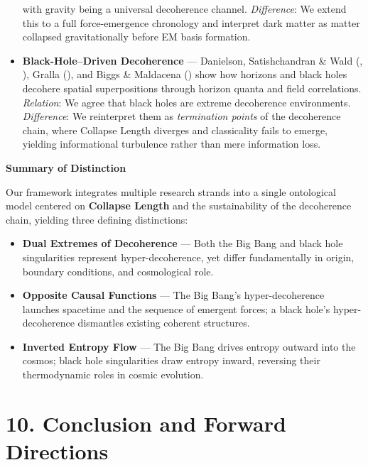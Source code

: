 \documentclass[
]{article}
\providecommand{\tightlist}{%
  \setlength{\itemsep}{0pt}\setlength{\parskip}{0pt}}
\begin{document}
\begin{itemize}
  with gravity being a universal decoherence channel. \emph{Difference}:
  We extend this to a full force-emergence chronology and interpret dark
  matter as matter collapsed gravitationally before EM basis formation.
\item
  \textbf{Black-Hole--Driven Decoherence} --- Danielson, Satishchandran
  \& Wald (, ), Gralla
  (), and Biggs \& Maldacena
  () show how
  horizons and black holes decohere spatial superpositions through
  horizon quanta and field correlations. \emph{Relation}: We agree that
  black holes are extreme decoherence environments. \emph{Difference}:
  We reinterpret them as \emph{termination points} of the decoherence
  chain, where Collapse Length diverges and classicality fails to
  emerge, yielding informational turbulence rather than mere information
  loss.
\end{itemize}

\textbf{Summary of Distinction}

Our framework integrates multiple research strands into a single
ontological model centered on \textbf{Collapse Length} and the
sustainability of the decoherence chain, yielding three defining
distinctions:

\begin{itemize}
\tightlist
\item
  \textbf{Dual Extremes of Decoherence} --- Both the Big Bang and black
  hole singularities represent hyper-decoherence, yet differ
  fundamentally in origin, boundary conditions, and cosmological role.
\item
  \textbf{Opposite Causal Functions} --- The Big Bang's
  hyper-decoherence launches spacetime and the sequence of emergent
  forces; a black hole's hyper-decoherence dismantles existing coherent
  structures.
\item
  \textbf{Inverted Entropy Flow} --- The Big Bang drives entropy outward
  into the cosmos; black hole singularities draw entropy inward,
  reversing their thermodynamic roles in cosmic evolution.
\end{itemize}

\section{10. Conclusion and Forward
Directions}\label{conclusion-and-forward-directions}
\end{document}
